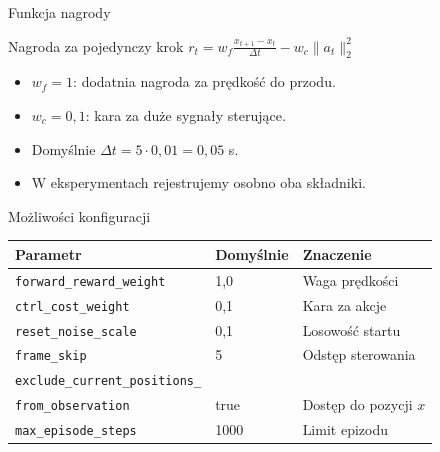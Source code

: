 \documentclass[aspectratio=169,11pt]{beamer}
\begin{document}
\begin{frame}{Funkcja nagrody}
  \begin{block}{Nagroda za pojedynczy krok}
    \centering \Large $r_t = w_f\frac{x_{t+1}-x_t}{\Delta t}-w_c\lVert a_t\rVert_2^2$
  \end{block}
  \vspace{0.3em}
  \begin{itemize}
    \item $w_f=1$: dodatnia nagroda za pr\k{e}dko\'s\'c do przodu.
    \item $w_c=0{,}1$: kara za du\.ze sygna\l y steruj\k{a}ce.
    \item Domy\'slnie $\Delta t=5\cdot0{,}01=0{,}05$ s.
    \item W eksperymentach rejestrujemy osobno oba sk\l adniki.
  \end{itemize}
\end{frame}

\begin{frame}{Mo\.zliwo\'sci konfiguracji}
  \small
  \begin{tabular}{@{}p{}p{}p{}@{}}
    \toprule
    Parametr & Domy\'slnie & Znaczenie\\
    \midrule
    \texttt{forward\_reward\_weight} & 1,0 & Waga pr\k{e}dko\'sci\\
    \texttt{ctrl\_cost\_weight} & 0,1 & Kara za akcje\\
    \texttt{reset\_noise\_scale} & 0,1 & Losowo\'s\'c startu\\
    \texttt{frame\_skip} & 5 & Odst\k{e}p sterowania\\
    \texttt{exclude\_current\_positions\_}\\\texttt{from\_observation} & true & Dost\k{e}p do pozycji $x$\\
    \texttt{max\_episode\_steps} & 1000 & Limit epizodu\\
    \bottomrule
  \end{tabular}
  \vspace{0.6em}
\end{frame}
\end{document}
